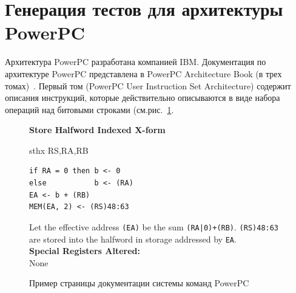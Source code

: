 \section{Генерация тестов для архитектуры PowerPC}

Архитектура PowerPC разработана компанией IBM. Документация по архитектуре
PowerPC представлена в PowerPC Architecture Book (в трех томах)~\cite{PowerPC}. Первый том (PowerPC User Instruction Set Architecture) содержит описания инструкций, которые действительно описываются в виде набора операций над битовыми строками (см.рис.~\ref{fig:ppc_page}.

\begin{figure}
\textbf{Store Halfword Indexed X-form}

sthx RS,RA,RB

\begin{verbatim}
if RA = 0 then b <- 0
else           b <- (RA)
EA <- b + (RB)
MEM(EA, 2) <- (RS)48:63
\end{verbatim}

Let the effective address \texttt{(EA)} be the sum \texttt{(RA|0)+(RB)}. \texttt{(RS)48:63} are stored into the halfword in storage addressed by \texttt{EA}.\\

\textbf{Special Registers Altered:}\\
None
\caption{Пример страницы документации системы команд PowerPC}\label{fig:ppc_page}
\end{figure}

